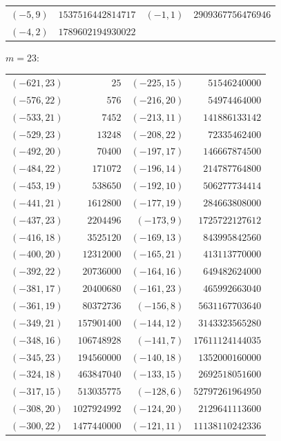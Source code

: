 \documentclass[11pt]{amsart}
\theoremstyle{definition}
\begin{document}
{\scriptsize\begin{tabular}{@{}r@{\ \ }r@{\qquad}r@{\ \ }r@{}}
$(-5,9)$ & $1537516442814717$ & $(-1,1)$ & $2909367756476946$ \\
$(-4,2)$ & $1789602194930022$ & & \\
\end{tabular}}\par\medskip
\noindent$m=23$:\nopagebreak\\[2pt]
{\scriptsize\begin{tabular}{@{}r@{\ \ }r@{\qquad}r@{\ \ }r@{}}
$(-621,23)$ & $25$ & $(-225,15)$ & $51546240000$ \\
$(-576,22)$ & $576$ & $(-216,20)$ & $54974464000$ \\
$(-533,21)$ & $7452$ & $(-213,11)$ & $141886133142$ \\
$(-529,23)$ & $13248$ & $(-208,22)$ & $72335462400$ \\
$(-492,20)$ & $70400$ & $(-197,17)$ & $146667874500$ \\
$(-484,22)$ & $171072$ & $(-196,14)$ & $214787764800$ \\
$(-453,19)$ & $538650$ & $(-192,10)$ & $506277734414$ \\
$(-441,21)$ & $1612800$ & $(-177,19)$ & $284663808000$ \\
$(-437,23)$ & $2204496$ & $(-173,9)$ & $1725722127612$ \\
$(-416,18)$ & $3525120$ & $(-169,13)$ & $843995842560$ \\
$(-400,20)$ & $12312000$ & $(-165,21)$ & $413113770000$ \\
$(-392,22)$ & $20736000$ & $(-164,16)$ & $649482624000$ \\
$(-381,17)$ & $20400680$ & $(-161,23)$ & $465992663040$ \\
$(-361,19)$ & $80372736$ & $(-156,8)$ & $5631167703640$ \\
$(-349,21)$ & $157901400$ & $(-144,12)$ & $3143323565280$ \\
$(-348,16)$ & $106748928$ & $(-141,7)$ & $17611124144035$ \\
$(-345,23)$ & $194560000$ & $(-140,18)$ & $1352000160000$ \\
$(-324,18)$ & $463847040$ & $(-133,15)$ & $2692518051600$ \\
$(-317,15)$ & $513035775$ & $(-128,6)$ & $52797261964950$ \\
$(-308,20)$ & $1027924992$ & $(-124,20)$ & $2129641113600$ \\
$(-300,22)$ & $1477440000$ & $(-121,11)$ & $11138110242336$ \\

\end{tabular}}
\end{document}
